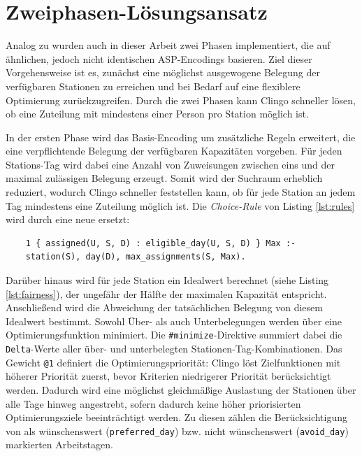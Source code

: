 \section{Zweiphasen-Lösungsansatz}
Analog zu \textcite{cardellini2023solvingrehabilitationschedulingproblems} wurden auch in dieser Arbeit zwei Phasen implementiert, die auf ähnlichen, jedoch nicht identischen ASP-Encodings basieren.
Ziel dieser Vorgehensweise ist es, zunächst eine möglichst ausgewogene Belegung der verfügbaren Stationen zu erreichen und bei Bedarf auf eine flexiblere Optimierung zurückzugreifen. Durch die zwei Phasen kann Clingo schneller lösen, ob eine Zuteilung mit mindestens einer Person pro Station möglich ist.

In der ersten Phase wird das Basis-Encoding um zusätzliche Regeln erweitert, die eine verpflichtende Belegung der verfügbaren Kapazitäten vorgeben. Für jeden Stations-Tag wird dabei eine Anzahl von Zuweisungen zwischen eins und der maximal zulässigen Belegung erzeugt. Somit wird der Suchraum erheblich reduziert, wodurch Clingo schneller feststellen kann, ob für jede Station an jedem Tag mindestens eine Zuteilung möglich ist.
Die \textit{Choice-Rule} von Listing \ref{lst:rules} wird durch eine neue ersetzt:

\begin{lstlisting}
	1 { assigned(U, S, D) : eligible_day(U, S, D) } Max :-
	station(S), day(D), max_assignments(S, Max).
\end{lstlisting}

 Darüber hinaus wird für jede Station ein Idealwert berechnet (siehe Listing \ref{lst:fairness}), der ungefähr der Hälfte der maximalen Kapazität entspricht. Anschließend wird die Abweichung der tatsächlichen Belegung von diesem Idealwert bestimmt. Sowohl Über- als auch Unterbelegungen werden über eine Optimierungsfunktion minimiert. Die \texttt{\#minimize}-Direktive summiert dabei die \texttt{Delta}-Werte aller über- und unterbelegten Stationen-Tag-Kombinationen. Das Gewicht \texttt{@1} definiert die Optimierungspriorität: Clingo löst Zielfunktionen mit höherer Priorität zuerst, bevor Kriterien niedrigerer Priorität berücksichtigt werden. Dadurch wird eine möglichst gleichmäßige Auslastung der Stationen über alle Tage hinweg angestrebt, sofern dadurch keine höher priorisierten Optimierungsziele beeinträchtigt werden. Zu diesen zählen die Berücksichtigung von als wünschenswert (\texttt{preferred\_day}) bzw. nicht wünschenswert (\texttt{avoid\_day}) markierten Arbeitstagen.
 

